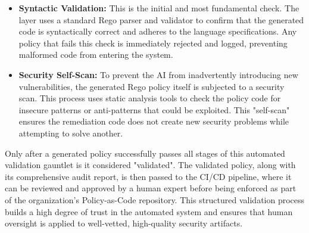 \begin{itemize}
    \item \textbf{Syntactic Validation:} This is the initial and most fundamental check. The layer uses a standard Rego parser and validator to confirm that the generated code is syntactically correct and adheres to the language specifications. Any policy that fails this check is immediately rejected and logged, preventing malformed code from entering the system.
    \item \textbf{Security Self-Scan:} To prevent the AI from inadvertently introducing new vulnerabilities, the generated Rego policy itself is subjected to a security scan. This process uses static analysis tools to check the policy code for insecure patterns or anti-patterns that could be exploited. This "self-scan" ensures the remediation code does not create new security problems while attempting to solve another.

\end{itemize}

Only after a generated policy successfully passes all stages of this automated validation gauntlet is it considered "validated". The validated policy, along with its comprehensive audit report, is then passed to the CI/CD pipeline, where it can be reviewed and approved by a human expert before being enforced as part of the organization's Policy-as-Code repository. This structured validation process builds a high degree of trust in the automated system and ensures that human oversight is applied to well-vetted, high-quality security artifacts.

